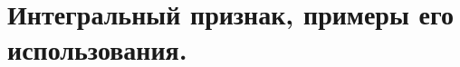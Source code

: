 \documentclass[../main.tex]{subfiles}
\begin{document}
\newpage
\section{Интегральный признак, примеры его использования.}
\end{document}
